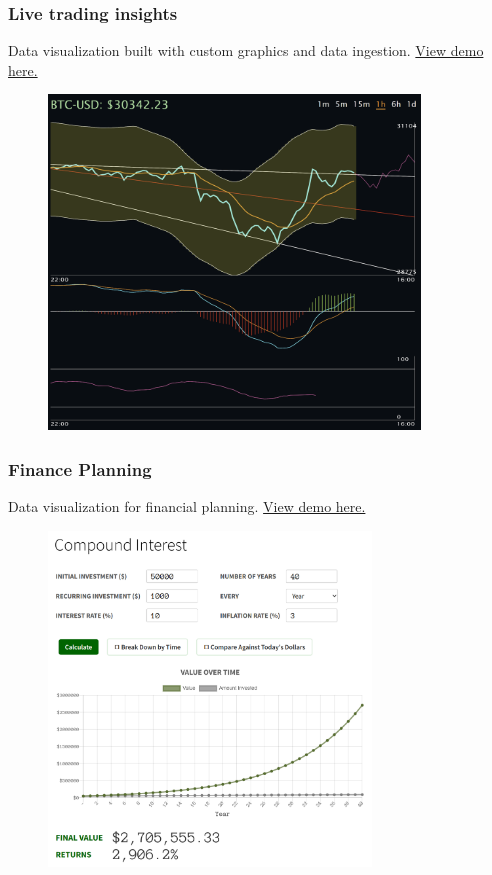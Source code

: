 \clearpage
\subsubsection{Live trading insights}

Data visualization built with custom graphics and data ingestion. \href{https://mikinty.github.io/btc-marco/}{View demo here.} 
\vspace{12pt}
\begin{figure}[H]
  \centering
  \includegraphics[height=3.5in]{bitcoin.png}
\end{figure}

\subsubsection{Finance Planning}

Data visualization for financial planning. \href{https://viriditycapital.github.io/financial-planning-tools/}{View demo here.} 
\vspace{12pt}
\begin{figure}[H]
  \centering
  \includegraphics[height=3.5in]{finance.png}
\end{figure}


